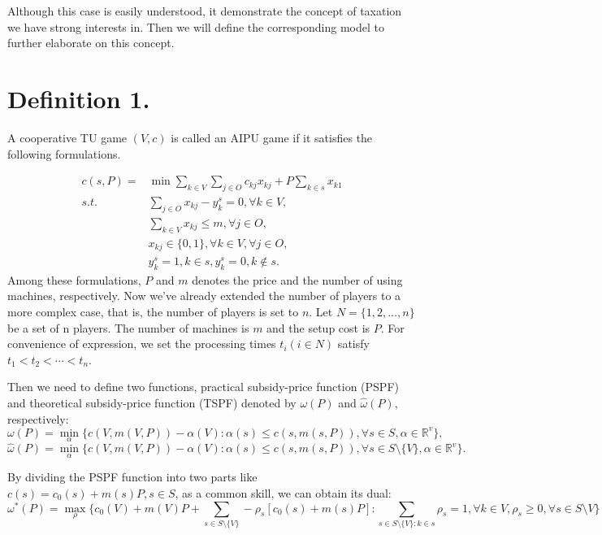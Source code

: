 \documentclass[UTF8]{article}
\begin{document}
Although this case is easily understood, it demonstrate the concept of taxation we have strong interests in. Then we will define the corresponding model to further elaborate on this concept.

\section*{Definition 1.}

A cooperative TU game $(V,c)$ is called an AIPU game if it satisfies the following formulations.

\[
\begin{aligned}
c(s,P) = & {\min} \sum_{k\in V}\sum_{j\in O} {c_{kj} x_{kj}} + {P\sum_{k\in s} x_{k1}} \\
{s.t.}\quad & \sum_{j \in O} x_{kj}-y_k^s=0, \forall k \in V, \\
& \sum_{k\in V} x_{kj} \leq m,\forall j \in O,  \\
& x_{kj} \in \{0,1\} , \forall k \in V, \forall j \in O,\\
& y_k^s=1, k \in s, y_k^s=0, k \notin s.
\end{aligned}
\]
Among these formulations, $P$ and $m$ denotes the price and the number of using machines, respectively.
Now we've already extended the number of players to a more complex case, that is, the number of players is set to $n$.
Let $N=\{1,2,\ldots,n\}$ be a set of n players. The number of machines is $m$ and the setup cost is $P$.
For convenience of expression, we set the processing times $t_i(i\in N)$ satisfy $t_1<t_2<\cdots<t_n$.

Then we need to define two functions, practical subsidy-price function (PSPF) and theoretical subsidy-price function (TSPF) denoted by $\omega(P)$ and $\hat{\omega}(P)$, respectively:
\[
  {\omega(P)}=\mathop{\min}_{\alpha}\{c(V,m(V,P))-\alpha(V): \alpha(s)\leq c(s,m(s,P))
 ,\forall s \in S, \alpha\in\mathbb{R}^{v}\},
\]
\[
  {\hat{\omega}(P)}=\mathop{\min}_{\alpha}\{c(V,m(V,P))-\alpha(V): \alpha(s)\leq c(s,m(s,P))
 ,\forall s \in S\setminus\{V\}, \alpha\in\mathbb{R}^{v}\}.
\]

By dividing the PSPF function into two parts like $c(s)=c_0(s)+m(s)P, s \in S$, as a common skill, we can obtain its dual:
\begin{equation}\label{dual}
 {\omega^*(P)}=\mathop{\max}_{\rho} \{c_0(V)+m(V)P+\sum_{s\in S\setminus\{V\}}-\rho_s[c_0(s)+m(s)P]:
 \sum_{s\in S\setminus\{V\}:k\in s}\rho_s=1,\forall k \in V,\rho_s\geq 0,\forall s \in S \setminus{V}\}
\end{equation}
\end{document}
